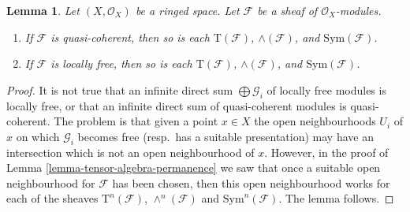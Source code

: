 \documentclass[10pt,a4paper]{amsart}
\theoremstyle{plain}
\newtheorem{lemma}[subsection]{Lemma}
\theoremstyle{definition}
\theoremstyle{remark}
\numberwithin{equation}{subsection}
\begin{document}
\begin{lemma}
\label{lemma-whole-tensor-algebra-permanence}
Let $(X, \mathcal{O}_X)$ be a ringed space.
Let $\mathcal{F}$ be a sheaf of $\mathcal{O}_X$-modules.
\begin{enumerate}
\item If $\mathcal{F}$ is quasi-coherent,
then so is each $\text{T}(\mathcal{F})$,
$\wedge(\mathcal{F})$, and $\text{Sym}(\mathcal{F})$.
\item If $\mathcal{F}$ is locally free,
then so is each $\text{T}(\mathcal{F})$,
$\wedge(\mathcal{F})$, and $\text{Sym}(\mathcal{F})$.
\end{enumerate}
\end{lemma}

\begin{proof}
It is not true that an infinite direct sum $\bigoplus \mathcal{G}_i$ of
locally free modules is locally free, or that an
infinite direct sum of quasi-coherent modules
is quasi-coherent. The problem is that given a
point $x \in X$ the open neighbourhoods $U_i$ of $x$ on which $\mathcal{G}_i$
becomes free (resp.\ has a suitable presentation) may have an intersection
which is not an open neighbourhood of $x$. However, in the
proof of Lemma \ref{lemma-tensor-algebra-permanence} we saw that
once a suitable open neighbourhood for $\mathcal{F}$ has been chosen,
then this open neighbourhood works for each of the sheaves
$\text{T}^n(\mathcal{F})$, $\wedge^n(\mathcal{F})$ and
$\text{Sym}^n(\mathcal{F})$.
The lemma follows.
\end{proof}
\end{document}
